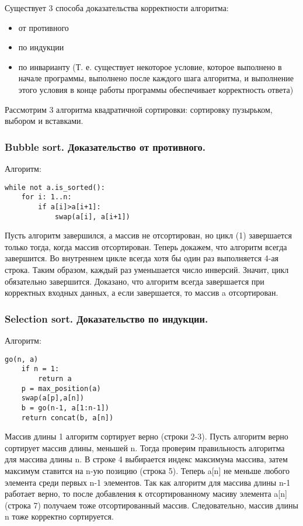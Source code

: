 \documentclass[a4paper, 12pt]{article}
\begin{document}
Существует 3 способа доказательства корректности алгоритма:
    \begin{itemize}
        \item от противного
        \item по индукции
        \item по инварианту (Т. е. существует некоторое условие, которое выполнено в начале программы,  выполнено после каждого шага алгоритма, и выполнение этого условия в конце работы программы обеспечивает корректность ответа)
    \end{itemize}

Рассмотрим 3 алгоритма квадратичной сортировки: сортировку пузырьком, выбором и вставками.

\subsubsection*{Bubble sort. Доказательство от противного.}

Алгоритм:
\begin{lstlisting}
while not a.is_sorted():
    for i: 1..n:
        if a[i]>a[i+1]:
            swap(a[i], a[i+1])
\end{lstlisting}

Пусть алгоритм завершился, а массив не отсортирован, но цикл (1)
завершается только тогда, когда массив отсортирован. Теперь докажем, что алгоритм всегда завершится. Во внутреннем цикле всегда хотя бы один раз выполняется 4-ая строка. Таким образом, каждый раз уменьшается число инверсий. Значит, цикл обязательно завершится. Доказано, что алгоритм всегда завершается при корректных входных данных, а если завершается, то массив a отсортирован.

\subsubsection*{Selection sort. Доказательство по индукции.}
Алгоритм:
\begin{lstlisting}[firstnumber=1]
go(n, a)
    if n = 1:
        return a
    p = max_position(a)
    swap(a[p],a[n])
    b = go(n-1, a[1:n-1])
    return concat(b, a[n])
\end{lstlisting}

Массив длины 1 алгоритм сортирует верно (строки 2-3). Пусть алгоритм верно сортирует массив длины, меньшей n. Тогда проверим правильность алгоритма для массива длины n. В строке 4 выбирается индекс максимума массива, затем максимум ставится на n-ую позицию (строка 5). Теперь a[n] не меньше любого элемента среди первых n-1 элементов. Так как алгоритм для массива длины n-1 работает верно, то после добавления к отсортированному масиву элемента a[n] (строка 7) получаем тоже отсортированный массив. Следовательно, массив длины n тоже корректно сортируется.
\end{document}
